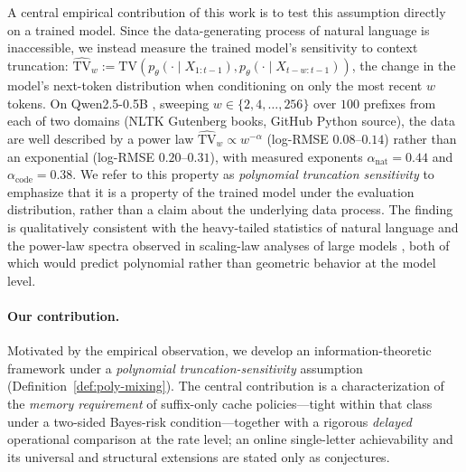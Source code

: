 \documentclass[11pt]{article}
\newcommand{\TV}{\mathrm{TV}}
\theoremstyle{plain}
\theoremstyle{definition}
\theoremstyle{remark}
\begin{document}
A central empirical contribution of this work is to test this
assumption directly on a trained model. Since the data-generating
process of natural language is inaccessible, we instead measure the
trained model's sensitivity to context truncation:
$\widehat{\TV}_w := \TV(p_\theta(\cdot \mid X_{1:t-1}),
p_\theta(\cdot \mid X_{t-w:t-1}))$, the change in the model's
next-token distribution when conditioning on only the most recent
$w$ tokens. On Qwen2.5-0.5B \citep{qwen2024}, sweeping $w \in
\{2, 4, \ldots, 256\}$ over $100$ prefixes from each of two domains
(NLTK Gutenberg books, GitHub Python source), the data are well
described by a power law $\widehat{\TV}_w \propto w^{-\alpha}$
(log-RMSE $0.08$--$0.14$) rather than an exponential
(log-RMSE $0.20$--$0.31$), with measured exponents
$\alpha_{\text{nat}} = 0.44$ and $\alpha_{\text{code}} = 0.38$. We
refer to this property as \emph{polynomial truncation sensitivity}
to emphasize that it is a property of the trained model under the
evaluation distribution, rather than a claim about the underlying
data process. The finding is qualitatively consistent with the
heavy-tailed statistics of natural language
\citep{piantadosi2014zipf} and the power-law spectra observed in
scaling-law analyses of large models \citep{kaplan2020scaling},
both of which would predict polynomial rather than geometric
behavior at the model level.

\paragraph{Our contribution.}
Motivated by the empirical observation, we develop an
information-theoretic framework under a \emph{polynomial
truncation-sensitivity} assumption
(Definition~\ref{def:poly-mixing}). The central contribution is a
characterization of the \emph{memory requirement} of suffix-only
cache policies---tight within that class under a two-sided Bayes-risk
condition---together with a rigorous \emph{delayed} operational
comparison at the rate level; an online single-letter achievability
and its universal and structural extensions are stated only as
conjectures.
\end{document}
